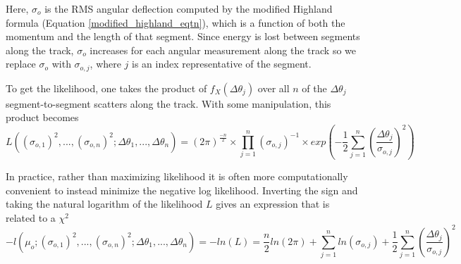 \documentclass[a4paper,11pt]{article}
\begin{document}
Here, $\sigma_o$ is the RMS angular deflection computed by the modified Highland formula (Equation \ref{modified_highland_eqtn}), which is a function of both the momentum and the length of that segment. Since energy is lost between segments along the track, $\sigma_o$ increases for each angular measurement along the track so we replace $\sigma_o$ with $\sigma_{o,j}$, where $j$ is an index representative of the segment. \newline

To get the likelihood, one takes the product of $f_X(\Delta\theta_j)$ over all $n$ of the $\Delta\theta_j$ segment-to-segment scatters along the track. With some manipulation, this product becomes
\begin{equation}
L((\sigma_{o,1})^2,...,(\sigma_{o,n})^2;\Delta\theta_1,...,\Delta\theta_n) = (2\pi)^\frac{-n}{2}\times\prod_{j=1}^{n}(\sigma_{o,j})^{-1} \times exp(-\frac{1}{2}\sum_{j=1}^{n}(\frac{\Delta\theta_j}{\sigma_{o,j}})^2)
\end{equation}

In practice, rather than maximizing likelihood it is often more computationally convenient to instead minimize the negative log likelihood. Inverting the sign and taking the natural logarithm of the likelihood $L$ gives an expression that is related to a $\chi^2$
\begin{equation}\label{leo_llhd_eqtn}
-l(\mu_o;(\sigma_{o,1})^2,...,(\sigma_{o,n})^2;\Delta\theta_1,...,\Delta\theta_n) = -ln(L) = \frac{n}{2}ln(2\pi) + \sum_{j=1}^{n}ln(\sigma_{o,j}) + \frac{1}{2}\sum_{j=1}^{n}(\frac{\Delta\theta_j}{\sigma_{o,j}})^2
\end{equation}


\end{document}
